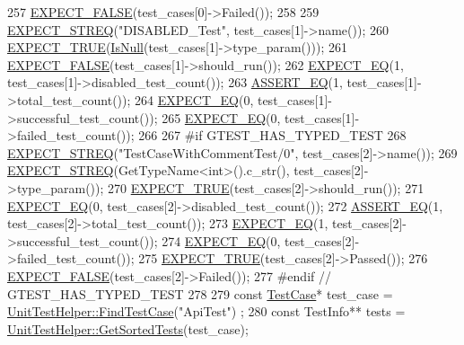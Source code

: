 \begin{DoxyCode}
257     \hyperlink{gtest_8h_aeb6c7ae89f440c90c1a1815951c836da}{EXPECT\_FALSE}(test\_cases[0]->Failed());
258 
259     \hyperlink{gtest_8h_ad20f7b94ac5081e16f0005b94e95f0c6}{EXPECT\_STREQ}(\textcolor{stringliteral}{"DISABLED\_Test"}, test\_cases[1]->name());
260     \hyperlink{gtest_8h_ac33e7cdfb5d44a7a0f0ab552eb5c3c6a}{EXPECT\_TRUE}(\hyperlink{namespacetesting_1_1internal_adcfd37a66bc4cb0e8291cf46e1a6c72b}{IsNull}(test\_cases[1]->type\_param()));
261     \hyperlink{gtest_8h_aeb6c7ae89f440c90c1a1815951c836da}{EXPECT\_FALSE}(test\_cases[1]->should\_run());
262     \hyperlink{gtest_8h_a4159019abda84f5366acdb7604ff220a}{EXPECT\_EQ}(1, test\_cases[1]->disabled\_test\_count());
263     \hyperlink{gtest_8h_a1a6db8b1338ee7040329322b77779086}{ASSERT\_EQ}(1, test\_cases[1]->total\_test\_count());
264     \hyperlink{gtest_8h_a4159019abda84f5366acdb7604ff220a}{EXPECT\_EQ}(0, test\_cases[1]->successful\_test\_count());
265     \hyperlink{gtest_8h_a4159019abda84f5366acdb7604ff220a}{EXPECT\_EQ}(0, test\_cases[1]->failed\_test\_count());
266 
267 \textcolor{preprocessor}{#if GTEST\_HAS\_TYPED\_TEST}
268     \hyperlink{gtest_8h_ad20f7b94ac5081e16f0005b94e95f0c6}{EXPECT\_STREQ}(\textcolor{stringliteral}{"TestCaseWithCommentTest/0"}, test\_cases[2]->name());
269     \hyperlink{gtest_8h_ad20f7b94ac5081e16f0005b94e95f0c6}{EXPECT\_STREQ}(GetTypeName<int>().c\_str(), test\_cases[2]->type\_param());
270     \hyperlink{gtest_8h_ac33e7cdfb5d44a7a0f0ab552eb5c3c6a}{EXPECT\_TRUE}(test\_cases[2]->should\_run());
271     \hyperlink{gtest_8h_a4159019abda84f5366acdb7604ff220a}{EXPECT\_EQ}(0, test\_cases[2]->disabled\_test\_count());
272     \hyperlink{gtest_8h_a1a6db8b1338ee7040329322b77779086}{ASSERT\_EQ}(1, test\_cases[2]->total\_test\_count());
273     \hyperlink{gtest_8h_a4159019abda84f5366acdb7604ff220a}{EXPECT\_EQ}(1, test\_cases[2]->successful\_test\_count());
274     \hyperlink{gtest_8h_a4159019abda84f5366acdb7604ff220a}{EXPECT\_EQ}(0, test\_cases[2]->failed\_test\_count());
275     \hyperlink{gtest_8h_ac33e7cdfb5d44a7a0f0ab552eb5c3c6a}{EXPECT\_TRUE}(test\_cases[2]->Passed());
276     \hyperlink{gtest_8h_aeb6c7ae89f440c90c1a1815951c836da}{EXPECT\_FALSE}(test\_cases[2]->Failed());
277 \textcolor{preprocessor}{#endif  // GTEST\_HAS\_TYPED\_TEST}
278 
279     \textcolor{keyword}{const} \hyperlink{namespacegmock__test__utils_a959c5af591e4d49b6d35745205b64509}{TestCase}* test\_case = \hyperlink{classtesting_1_1internal_1_1UnitTestHelper_a46303cbb7a6abb456f7b1350542113ac}{UnitTestHelper::FindTestCase}(\textcolor{stringliteral}{"ApiTest"})
      ;
280     \textcolor{keyword}{const} TestInfo** tests = \hyperlink{classtesting_1_1internal_1_1UnitTestHelper_a02602d22fb74566dad78c0c9d4f24e78}{UnitTestHelper::GetSortedTests}(test\_case);

\end{DoxyCode}
